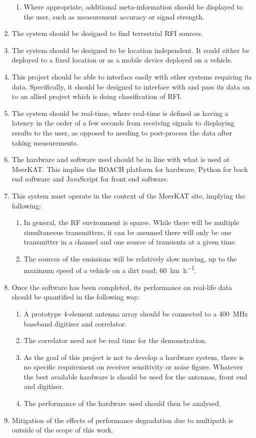 \begin{enumerate}
\begin{enumerate}
      \item Where appropriate, additional meta-information should be displayed to the user, such as measurement accuracy or signal strength.
    \end{enumerate}
  \item The system should be designed to find terrestrial RFI sources.
  \item The system should be designed to be location independent. It could either be deployed to a fixed location or as a mobile device deployed on a vehicle.
  \item This project should be able to interface easily with other systems requiring its data. Specifically, it should be designed to interface with and pass its data on to an allied project which is doing classification of RFI.
  \item The system should be real-time, where real-time is defined as having a latency in the order of a few seconds from receiving signals to displaying results to the user, as opposed to needing to post-process the data after taking measurements.
  \item The hardware and software used should be in line with what is used at MeerKAT. This implies the ROACH platform for hardware, Python for back end software and JavaScript for front end software.  
  \item This system must operate in the context of the MeerKAT site, implying the following:
  \begin{enumerate}
      \item In general, the RF environment is sparse. While there will be multiple simultaneous transmitters, it can be assumed there will only be one transmitter in a channel and one source of transients at a given time.
      \item The sources of the emissions will be relatively slow moving, up to the maximum speed of a vehicle on a dirt road; \SI[per-mode=symbol]{60}{\kilo\metre\per\hour}.
  \end{enumerate}

  \item Once the software has been completed, its performance on real-life data should be quantified in the following way:
    \begin{enumerate}
      \item A prototype 4-element antenna array should be connected to a \SI{400}{\mega\hertz} baseband digitiser and correlator.
      \item The correlator need not be real time for the demonstration.
      \item As the goal of this project is not to develop a hardware system, there is no specific requirement on receiver sensitivity or noise figure. Whatever the best available hardware is should be used for the antennas, front end and digitiser. 
      \item The performance of the hardware used should then be analysed. 
    \end{enumerate}
  \item Mitigation of the effects of performance degradation due to multipath is outside of the scope of this work.


\end{enumerate}
